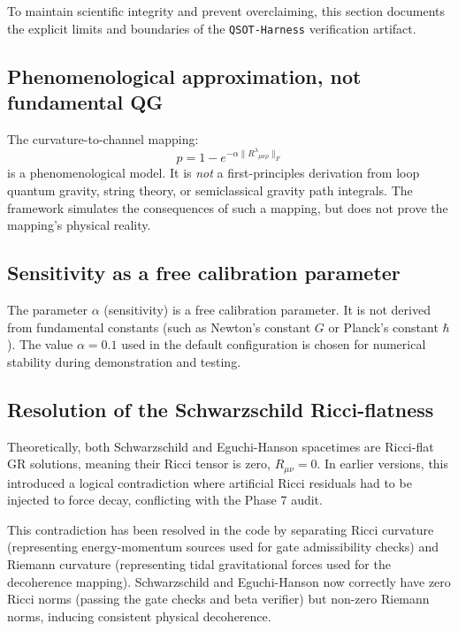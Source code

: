 
To maintain scientific integrity and prevent overclaiming, this section documents the explicit limits and boundaries of the \texttt{QSOT-Harness} verification artifact.

\subsection{Phenomenological approximation, not fundamental QG}
The curvature-to-channel mapping:
$$p = 1 - e^{-\alpha \|R^\lambda{}_{\mu\nu\rho}\|_F}$$
is a phenomenological model. It is \emph{not} a first-principles derivation from loop quantum gravity, string theory, or semiclassical gravity path integrals. The framework simulates the consequences of such a mapping, but does not prove the mapping's physical reality.

\subsection{Sensitivity as a free calibration parameter}
The parameter $\alpha$ (sensitivity) is a free calibration parameter. It is not derived from fundamental constants (such as Newton's constant $G$ or Planck's constant $\hbar$). The value $\alpha = 0.1$ used in the default configuration is chosen for numerical stability during demonstration and testing.

\subsection{Resolution of the Schwarzschild Ricci-flatness}
Theoretically, both Schwarzschild and Eguchi-Hanson spacetimes are Ricci-flat GR solutions, meaning their Ricci tensor is zero, $R_{\mu\nu} = 0$. In earlier versions, this introduced a logical contradiction where artificial Ricci residuals had to be injected to force decay, conflicting with the Phase 7 audit. 

This contradiction has been resolved in the code by separating Ricci curvature (representing energy-momentum sources used for gate admissibility checks) and Riemann curvature (representing tidal gravitational forces used for the decoherence mapping). Schwarzschild and Eguchi-Hanson now correctly have zero Ricci norms (passing the gate checks and beta verifier) but non-zero Riemann norms, inducing consistent physical decoherence.

